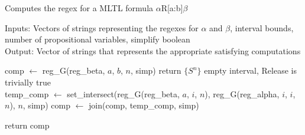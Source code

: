 \documentclass[runningheads]{llncs}
\begin{document}
\begin{algorithm}[H]
\caption{Computes the regex for a MLTL formula $\alpha$R[a:b]$\beta$}
Inputs: Vectors of strings representing the regexes for $\alpha$ and $\beta$, interval bounds, number of propositional variables, simplify boolean\\
Output: Vector of strings that represents the appropriate satisfying computations 
\begin{algorithmic}
    \State comp $\leftarrow$ reg\_G(reg\_beta, $a$, $b$, $n$, simp)
        \State return $\{S^n\}$
        \Comment empty interval, Release is trivially true
    \EndIf
     \\
        \State temp\_comp $\leftarrow$ set\_intersect(reg\_G(reg\_beta, $a$, $i$, $n$), reg\_G(reg\_alpha, $i$, $i$, $n$), $n$, simp)
        \State comp $\leftarrow$ join(comp, temp\_comp, simp)
    \EndFor
    
    \State return comp
\EndProcedure
\end{algorithmic}
\end{algorithm}
\end{document}
